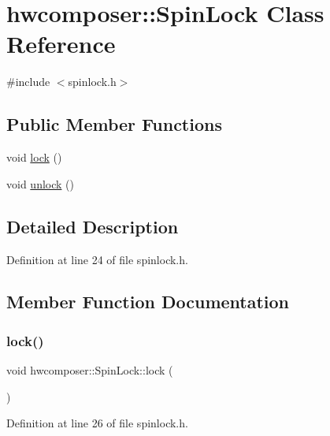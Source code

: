 \hypertarget{classhwcomposer_1_1SpinLock}{}\section{hwcomposer\+:\+:Spin\+Lock Class Reference}
\label{classhwcomposer_1_1SpinLock}


{\ttfamily \#include $<$spinlock.\+h$>$}

\subsection*{Public Member Functions}
\begin{DoxyCompactItemize}
\item 
void \mbox{\hyperlink{classhwcomposer_1_1SpinLock_a863f9d0f1b270f863a9298161b52faf1}{lock}} ()
\item 
void \mbox{\hyperlink{classhwcomposer_1_1SpinLock_ae5cf624b4f0ec710833ce44e945b85d7}{unlock}} ()
\end{DoxyCompactItemize}


\subsection{Detailed Description}


Definition at line 24 of file spinlock.\+h.



\subsection{Member Function Documentation}
\mbox{\label{classhwcomposer_1_1SpinLock_a863f9d0f1b270f863a9298161b52faf1}} 
\subsubsection{\texorpdfstring{lock()}{lock()}}
{\footnotesize\ttfamily void hwcomposer\+::\+Spin\+Lock\+::lock (\begin{DoxyParamCaption}{ }\end{DoxyParamCaption})\hspace{0.3cm}{\ttfamily [inline]}}



Definition at line 26 of file spinlock.\+h.


